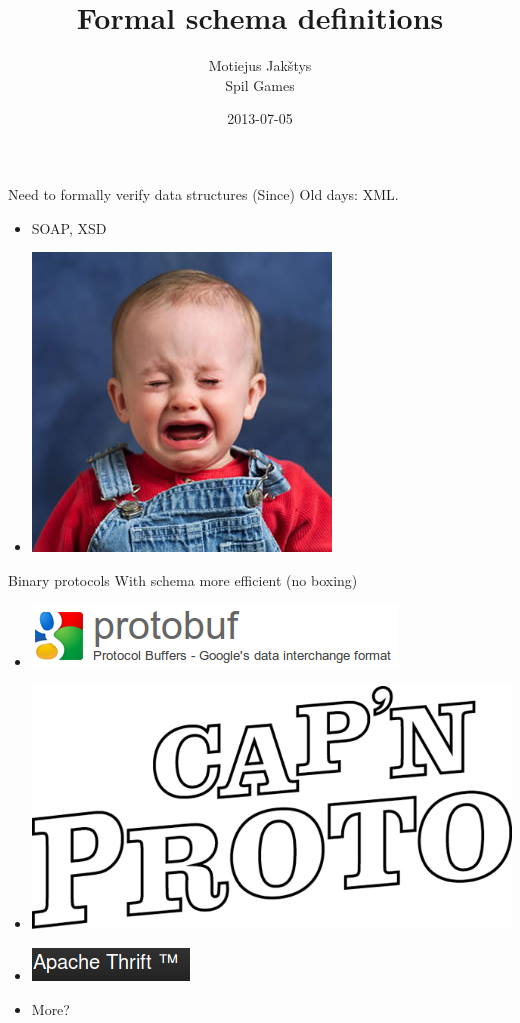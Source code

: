 \documentclass[14pt]{beamer}
\title{Formal schema definitions}
\author{Motiejus Jak\v{s}tys \\
Spil Games}
\date{2013-07-05}
\begin{document}
\begin{frame}[plain]
    \titlepage
\end{frame}

\begin{frame}{Need to formally verify data structures}
    (Since) Old days: XML.
    \pause
    \begin{itemize}
        \item SOAP, XSD
            \pause
        \item \includegraphics[height=0.5\textheight]{cry.jpg}
    \end{itemize}
\end{frame}

\begin{frame}{Binary protocols}
    With schema more efficient (no boxing)
    \begin{itemize}
        \item \includegraphics[height=0.1\textheight]{gpb.png}
        \item \includegraphics[height=0.2\textheight]{captain_proto.png}
        \item \includegraphics[height=0.05\textheight]{thrift.png}
        \item More?
    \end{itemize}
\end{frame}
\end{document}
